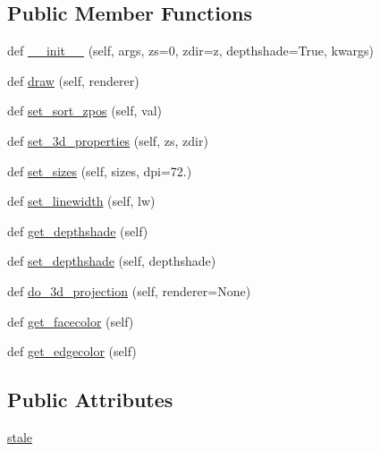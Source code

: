 \subsection*{Public Member Functions}
\begin{DoxyCompactItemize}
\item 
def \hyperlink{classmplot3d_1_1art3d_1_1Path3DCollection_aa4d8e52e853cb9ab90a3379433a2f08d}{\+\_\+\+\_\+init\+\_\+\+\_\+} (self, args, zs=0, zdir=\textquotesingle{}z\textquotesingle{}, depthshade=True, kwargs)
\item 
def \hyperlink{classmplot3d_1_1art3d_1_1Path3DCollection_abea57d4d686a1d1f8c095e6412f86383}{draw} (self, renderer)
\item 
def \hyperlink{classmplot3d_1_1art3d_1_1Path3DCollection_ac85e3de3eaaf6a8ef781ba9fe58a58e4}{set\+\_\+sort\+\_\+zpos} (self, val)
\item 
def \hyperlink{classmplot3d_1_1art3d_1_1Path3DCollection_a890c4b52e1dfad5fcbe261b3c0caa5c0}{set\+\_\+3d\+\_\+properties} (self, zs, zdir)
\item 
def \hyperlink{classmplot3d_1_1art3d_1_1Path3DCollection_a0714474e0f646f5e9b7de6547adf3036}{set\+\_\+sizes} (self, sizes, dpi=72.)
\item 
def \hyperlink{classmplot3d_1_1art3d_1_1Path3DCollection_a75a92ddaef2db7d8b0128c3e73ac6e18}{set\+\_\+linewidth} (self, lw)
\item 
def \hyperlink{classmplot3d_1_1art3d_1_1Path3DCollection_a93dd128376157e5232b3a4c3c16103a5}{get\+\_\+depthshade} (self)
\item 
def \hyperlink{classmplot3d_1_1art3d_1_1Path3DCollection_a68980b4192c872e0623d18b1436ab50f}{set\+\_\+depthshade} (self, depthshade)
\item 
def \hyperlink{classmplot3d_1_1art3d_1_1Path3DCollection_a1b2c2c6c452be3a5126e4af6d3ad37d8}{do\+\_\+3d\+\_\+projection} (self, renderer=None)
\item 
def \hyperlink{classmplot3d_1_1art3d_1_1Path3DCollection_aded0798c3a6687defbbc0a4bfc197ebe}{get\+\_\+facecolor} (self)
\item 
def \hyperlink{classmplot3d_1_1art3d_1_1Path3DCollection_acfcfdaf805ed78f8a76a05e3ff71659e}{get\+\_\+edgecolor} (self)
\end{DoxyCompactItemize}
\subsection*{Public Attributes}
\begin{DoxyCompactItemize}
\item 
\hyperlink{classmplot3d_1_1art3d_1_1Path3DCollection_a566efa2a58c5d4b0e58346a4da2c72fc}{stale}
\end{DoxyCompactItemize}


